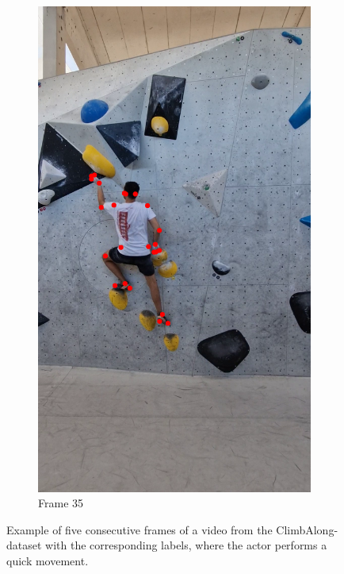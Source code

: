 \documentclass[./main.tex]{subfiles}
\begin{document}
\begin{figure}[htbp]
\begin{subfigure}{0.3\textwidth}
        \includegraphics[width=\textwidth]{entities/CA_35.png}
        \caption{Frame 35}
    \end{subfigure}

    \caption{Example of five consecutive frames of a video from the ClimbAlong-dataset with the corresponding labels, where the actor performs a quick movement.}
    \label{fig:CA_dataset_quick}
\end{figure}
\end{document}
